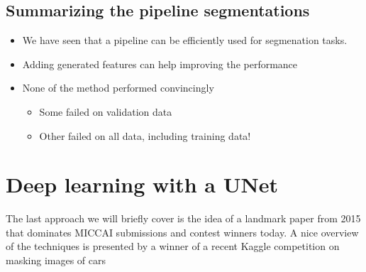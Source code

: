 \documentclass[letterpaper,10pt,english]{sphinxmanual}
\begin{document}
\begin{sphinxVerbatim}[commandchars=\\\{\}]
\PYG{p}{[}  \PYG{p}{]}   
\end{sphinxVerbatim}

\noindent{}


\section{Summarizing the pipeline segmentations}
\label{\detokenize{05-SupervisedSegmentation:summarizing-the-pipeline-segmentations}}\begin{itemize}
\item {} 
\sphinxAtStartPar
We have seen that a pipeline can be efficiently used for segmenation tasks.

\item {} 
\sphinxAtStartPar
Adding generated features can help improving the performance

\item {} 
\sphinxAtStartPar
None of the method performed convincingly
\begin{itemize}
\item {} 
\sphinxAtStartPar
Some failed on validation data

\item {} 
\sphinxAtStartPar
Other failed on all data, including training data!

\end{itemize}

\end{itemize}


\chapter{Deep learning with a U\sphinxhyphen{}Net}
\label{\detokenize{05-SupervisedSegmentation:deep-learning-with-a-u-net}}
\sphinxAtStartPar
The last approach we will briefly cover is the idea of  a landmark paper from 2015 that dominates MICCAI submissions and contest winners today. A nice overview of the techniques is presented by  a winner of a recent Kaggle competition on masking images of cars 
\end{document}

